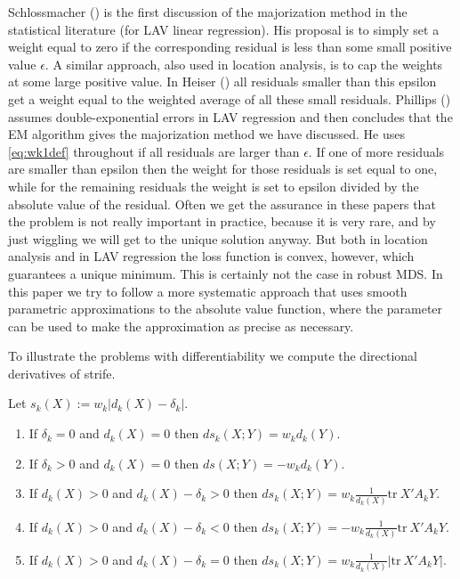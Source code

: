 \documentclass[
  12pt,
  letterpaper,
  DIV=11,
  numbers=noendperiod]{scrartcl}
\providecommand{\tightlist}{%
  \setlength{\itemsep}{0pt}\setlength{\parskip}{0pt}}\usepackage{longtable,booktabs,array}
\theoremstyle{plain}
\theoremstyle{plain}
\theoremstyle{plain}
\theoremstyle{definition}
\theoremstyle{remark}
\begin{document}
Schlossmacher () is the first
discussion of the majorization method in the statistical literature (for
LAV linear regression). His proposal is to simply set a weight equal to
zero if the corresponding residual is less than some small positive
value \(\epsilon\). A similar approach, also used in location analysis,
is to cap the weights at some large positive value. In Heiser
() all residuals smaller than this epsilon
get a weight equal to the weighted average of all these small residuals.
Phillips () assumes double-exponential
errors in LAV regression and then concludes that the EM algorithm gives
the majorization method we have discussed. He uses \eqref{eq:wk1def}
throughout if all residuals are larger than \(\epsilon\). If one of more
residuals are smaller than epsilon then the weight for those residuals
is set equal to one, while for the remaining residuals the weight is set
to epsilon divided by the absolute value of the residual. Often we get
the assurance in these papers that the problem is not really important
in practice, because it is very rare, and by just wiggling we will get
to the unique solution anyway. But both in location analysis and in LAV
regression the loss function is convex, however, which guarantees a
unique minimum. This is certainly not the case in robust MDS. In this
paper we try to follow a more systematic approach that uses smooth
parametric approximations to the absolute value function, where the
parameter can be used to make the approximation as precise as necessary.

To illustrate the problems with differentiability we compute the
directional derivatives of strife.

Let \(s_k(X):=w_k|d_k(X)-\delta_k|\).

\begin{enumerate}
\def\labelenumi{\arabic{enumi}.}
\tightlist
\item
  If \(\delta_k=0\) and \(d_k(X)=0\) then \(ds_k(X;Y)=w_kd_k(Y)\).
\item
  If \(\delta_k>0\) and \(d_k(X)=0\) then \(ds(X;Y)=-w_kd_k(Y)\).
\item
  If \(d_k(X)>0\) and \(d_k(X)-\delta_k>0\) then
  \(ds_k(X;Y)=w_k\frac{1}{d_k(X)}\text{tr}\ X'A_kY\).
\item
  If \(d_k(X)>0\) and \(d_k(X)-\delta_k<0\) then
  \(ds_k(X;Y)=-w_k\frac{1}{d_k(X)}\text{tr}\ X'A_kY\).
\item
  If \(d_k(X)>0\) and \(d_k(X)-\delta_k=0\) then
  \(ds_k(X;Y)=w_k\frac{1}{d_k(X)}|\text{tr}\ X'A_kY|\).
\end{enumerate}
\end{document}
